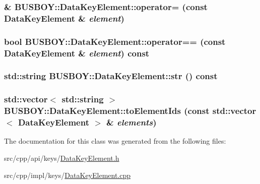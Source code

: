 \label{classBUSBOY_1_1DataKeyElement_a8c83f858dbda1cb7f3fe0cc5c5008719}
\hypertarget{classBUSBOY_1_1DataKeyElement_af409262d775de97c84082eb03ce7fd3e}{
\subsubsection[{operator=}]{ \& BUSBOY::DataKeyElement::operator= (const {\bf DataKeyElement} \& {\em element})}}
\label{classBUSBOY_1_1DataKeyElement_af409262d775de97c84082eb03ce7fd3e}
\hypertarget{classBUSBOY_1_1DataKeyElement_ab08e95251e5abcf1eb179f162b8431a1}{
\subsubsection[{operator==}]{\setlength{\rightskip}{0pt plus 5cm}bool BUSBOY::DataKeyElement::operator== (const {\bf DataKeyElement} \& {\em element}) const}}
\label{classBUSBOY_1_1DataKeyElement_ab08e95251e5abcf1eb179f162b8431a1}
\hypertarget{classBUSBOY_1_1DataKeyElement_a31f455462157d55473217d99a42bfdc5}{
\subsubsection[{str}]{\setlength{\rightskip}{0pt plus 5cm}std::string BUSBOY::DataKeyElement::str () const}}
\label{classBUSBOY_1_1DataKeyElement_a31f455462157d55473217d99a42bfdc5}
\hypertarget{classBUSBOY_1_1DataKeyElement_a5a00e57f4572dfe83c98aca908a3106b}{
\subsubsection[{toElementIds}]{\setlength{\rightskip}{0pt plus 5cm}std::vector$<$ std::string $>$ BUSBOY::DataKeyElement::toElementIds (const std::vector$<$ {\bf DataKeyElement} $>$ \& {\em elements})}}
\label{classBUSBOY_1_1DataKeyElement_a5a00e57f4572dfe83c98aca908a3106b}


The documentation for this class was generated from the following files:\begin{DoxyCompactItemize}
\item 
src/cpp/api/keys/\hyperlink{DataKeyElement_8h}{DataKeyElement.h}\item 
src/cpp/impl/keys/\hyperlink{DataKeyElement_8cpp}{DataKeyElement.cpp}\end{DoxyCompactItemize}
